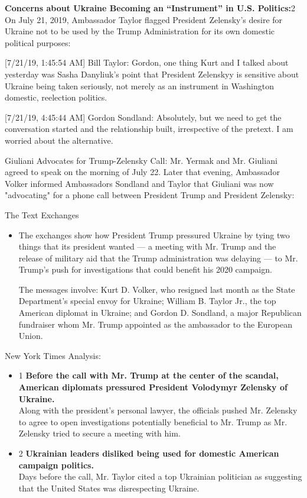 \textbf{Concerns about Ukraine Becoming an ``Instrument'' in U.S.
Politics:}2 On July 21, 2019, Ambassador Taylor flagged President
Zelensky's desire for Ukraine not to be used by the Trump Administration
for its own domestic political purposes:

{[}7/21/19, 1:45:54 AM{]} Bill Taylor: Gordon, one thing Kurt and I
talked about yesterday was Sasha Danyliuk's point that President
Zelenskyy is sensitive about Ukraine being taken seriously, not merely
as an instrument in Washington domestic, reelection politics.

{[}7/21/19, 4:45:44 AM{]} Gordon Sondland: Absolutely, but we need to
get the conversation started and the relationship built, irrespective of
the pretext. I am worried about the alternative.

Giuliani Advocates for Trump-Zelensky Call: Mr. Yermak and Mr. Giuliani
agreed to speak on the morning of July 22. Later that evening,
Ambassador Volker informed Ambassadors Sondland and Taylor that Giuliani
was now "advocating" for a phone call between President Trump and
President Zelensky:

The Text Exchanges

\begin{itemize}
\item
  The exchanges show how President Trump pressured Ukraine by tying two
  things that its president wanted --- a meeting with Mr. Trump and the
  release of military aid that the Trump administration was delaying ---
  to Mr. Trump's push for investigations that could benefit his 2020
  campaign.

  The messages involve: Kurt D. Volker, who resigned last month as the
  State Department's special envoy for Ukraine; William B. Taylor Jr.,
  the top American diplomat in Ukraine; and Gordon D. Sondland, a major
  Republican fundraiser whom Mr. Trump appointed as the ambassador to
  the European Union.
\end{itemize}

New York Times Analysis:

\begin{itemize}
\tightlist
\item
  1 \textbf{Before the call with Mr. Trump at the center of the scandal,
  American diplomats pressured President Volodymyr Zelensky of
  Ukraine.}\\
  Along with the president's personal lawyer, the officials pushed Mr.
  Zelensky to agree to open investigations potentially beneficial to Mr.
  Trump as Mr. Zelensky tried to secure a meeting with him.
\item
  2 \textbf{Ukrainian leaders disliked being used for domestic American
  campaign politics.}\\
  Days before the call, Mr. Taylor cited a top Ukrainian politician as
  suggesting that the United States was disrespecting Ukraine.
\end{itemize}

